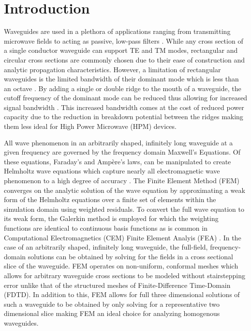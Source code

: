 \section{Introduction}
\label{sec:intro}

Waveguides are used in a plethora of applications ranging from transmitting microwave fields to acting as passive, low-pass filters \cite{pozar2011microwave}. While any cross section of a single conductor waveguide can support TE and TM modes, rectangular and circular cross sections are commonly chosen due to their ease of construction and analytic propagation characteristics. However, a limitation of rectangular waveguides is the limited bandwidth of their dominant mode which is less than an octave \cite{pozar2011microwave}. By adding a single or double ridge to the mouth of a waveguide, the cutoff frequency of the dominant mode can be reduced thus allowing for increased signal bandwidth \cite{pozar2011microwave}. This increased bandwidth comes at the cost of reduced power capacity due to the reduction in breakdown potential between the ridges \cite{pozar2011microwave} making them less ideal for High Power Microwave (HPM) devices.  

All wave phenomenon in an arbitrarily shaped, infinitely long waveguide at a given frequency are governed by the frequency domain Maxwell's Equations. Of these equations, Faraday's and Amp\`{e}re's laws, can be manipulated to create Helmholtz wave equations which capture nearly all electromagnetic wave phenomenon to a high degree of accuracy \cite{rothlecnotes}. The Finite Element Method (FEM) converges on the analytic solution of the wave equation by approximating a weak form of the Helmholtz equations over a finite set of elements within the simulation domain using weighted residuals. To convert the full wave equation to its weak form, the Galerkin method is employed for which the weighting functions are identical to continuous basis functions as is common in Computational Electromagnetics (CEM) Finite Element Analyis (FEA) \cite{rothlecnotes}. In the case of an arbitrarily shaped, infinitely long waveguide, the full-field, frequency-domain solutions can be obtained by solving for the fields in a cross sectional slice of the waveguide. FEM operates on non-uniform, conformal meshes which allows for arbitrary waveguide cross sections to be modeled without stairstepping error unlike that of the structured meshes of Finite-Difference Time-Domain (FDTD). In addition to this, FEM allows for full three dimensional solutions of such a waveguide to be obtained by only solving for a representative two dimensional slice making FEM an ideal choice for analyzing homogenous waveguides.

